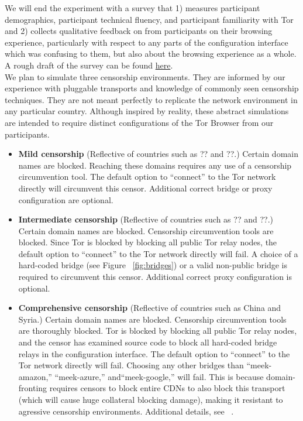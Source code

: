 \documentclass{template}
\begin{document}
We will end the experiment with a survey that 1) measures participant demographics, participant technical fluency, and participant familiarity with Tor and 2) collects qualitative feedback on from participants on their browsing experience, particularly with respect to any parts of the configuration interface which was confusing to them, but also about the browsing experience as a whole.  A rough draft of the survey can be found \href{http://www.surveygizmo.com/collab/2085559/Tor-Usability-Survey}{here}.\\

We plan to simulate three censorship environments.
They are informed by our experience with pluggable transports
and knowledge of commonly seen censorship techniques.
They are not meant perfectly to replicate the network environment
in any particular country. Although inspired by reality, these
abstract simulations are intended to require distinct configurations
of the Tor Browser from our participants. 

\begin{itemize} \itemsep1pt \parskip0pt 
\item {\bfseries Mild censorship} 
(Reflective of countries such as {\color{red}?? and ??}.)
Certain domain names are blocked. Reaching these 
domains requires any use of a censorship circumvention 
tool. The default option to ``connect'' to the Tor network 
directly will circumvent this censor. Additional correct
bridge or proxy configuration are optional. 
\item {\bfseries Intermediate censorship} 
(Reflective of countries such as {\color{red}?? and ??}.)
Certain domain names are blocked. Censorship circumvention
tools are blocked. Since Tor is blocked by blocking all public Tor
relay nodes, the default option to ``connect'' to the Tor network
directly will fail. A choice of a hard-coded bridge (see Figure ~\ref{fig:bridges})
or a valid non-public bridge is required to circumvent this censor.  
Additional correct proxy configuration is optional.
\item {\bfseries Comprehensive censorship} 
(Reflective of countries such as China and Syria.)
Certain domain names are blocked. Censorship circumvention tools
are thoroughly blocked. Tor is blocked by blocking all public
Tor relay nodes, and the censor has examined source code to block
all hard-coded bridge relays in the configuration interface. The default option
to ``connect'' to the Tor network directly will fail. Choosing any other bridges than
``meek-amazon,'' ``meek-azure,'' and``meek-google,'' will fail. This is because 
domain-fronting requires censors to block entire CDNs to also block this
transport (which will cause huge collateral blocking damage), making it resistant to agressive censorship environments. Additional details,
see ~\cite{fifield2015blocking}.\\
\end{itemize}
\end{document}
